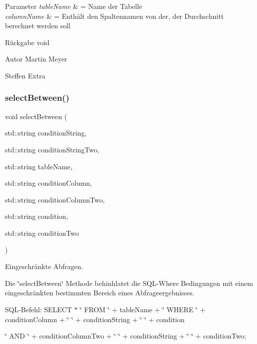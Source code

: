 \begin{DoxyParams}{Parameter}
{\em table\+Name} & = Name der Tabelle \\
\hline
{\em column\+Name} & = Enthält den Spaltennamen von der, der Durchschnitt berechnet werden soll\\
\hline
\end{DoxyParams}
\begin{DoxyReturn}{Rückgabe}
void
\end{DoxyReturn}
\begin{DoxyAuthor}{Autor}
Martin Meyer 

Steffen Extra 
\end{DoxyAuthor}
\mbox{\label{selection_request_8hpp_aaa15591ca7a3ba5d40fa77b7ae6753db}} 
\subsubsection{select\+Between()}
{\footnotesize\ttfamily void select\+Between (\begin{DoxyParamCaption}\item[{std\+::string}]{condition\+String,  }\item[{std\+::string}]{condition\+String\+Two,  }\item[{std\+::string}]{table\+Name,  }\item[{std\+::string}]{condition\+Column,  }\item[{std\+::string}]{condition\+Column\+Two,  }\item[{std\+::string}]{condition,  }\item[{std\+::string}]{condition\+Two }\end{DoxyParamCaption})}



Eingeschränkte Abfragen. 

Die \char`\"{}select\+Between\char`\"{} Methode behinhlatet die S\+Q\+L-\/\+Where Bedingungen mit einem eingeschränkten bestimmten Bereich eines Abfrageergebnisses.~\newline


S\+Q\+L-\/\+Befehl\+: S\+E\+L\+E\+CT $\ast$ \char`\"{} F\+R\+O\+M \char`\"{} + table\+Name + \char`\"{} W\+H\+E\+R\+E \char`\"{} + condition\+Column + \char`\"{} \char`\"{} + condition\+String + \char`\"{} \char`\"{} + condition
\begin{DoxyItemize}
\item \char`\"{} A\+N\+D \char`\"{} + condition\+Column\+Two + \char`\"{} \char`\"{} + condition\+String + \char`\"{} \char`\"{} + condition\+Two;
\end{DoxyItemize}


